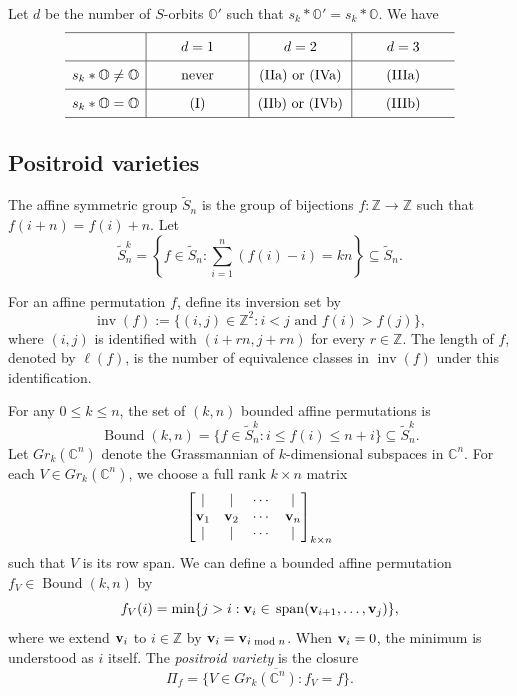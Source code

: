 \documentclass[12pt,reqno]{amsart}
\numberwithin{equation}{section}
\theoremstyle{definition}
\begin{document}
Let $d$ be the number of $S$-orbits $\mathbb{O}'$ such that $s_k*\mathbb{O}'=s_k*\mathbb{O}$.
We have 
$$\begin{array}{c|c|c|c}\hline
\vphantom{\dfrac12}
& \qquad d=1\qquad &\qquad d=2 \qquad
& \qquad d=3\qquad \\\hline
\vphantom{\dfrac12}
s_k*\mathbb{O}\neq \mathbb{O}
& \text{\rm never} & \rm (IIa) \text{ or } (IVa) & \rm (IIIa)\\\hline
\vphantom{\dfrac12}
s_k*\mathbb{O}= \mathbb{O} & \rm (I) & \rm (IIb) \text{ or } (IVb) & \rm (IIIb)\\\hline
\end{array}$$


\subsection{Positroid varieties}
The affine symmetric group $\widetilde{S}_n$ is the group of bijections $f:\mathbb{Z}\to \mathbb{Z}$ such that $f(i+n)=f(i)+n$. 
Let 
$$\widetilde{S}_{n}^{k}
=\left\{f\in \widetilde{S}_n:
\sum_{i=1}^n (f(i)-i) = kn
\right\}\subseteq \widetilde{S}_n. $$

For an affine permutation $f$, define its inversion set by
$$
\operatorname{inv}(f):=\{(i,j)\in \mathbb Z^2 : i<j \text{ and } f(i)>f(j)\},
$$
where $(i,j)$ is identified with $(i+rn,j+rn)$ for every $r\in \mathbb Z$.
The length of $f$, denoted by $\ell(f)$, is the number of equivalence classes
in $\operatorname{inv}(f)$ under this identification.

For any $0\leq k\leq n$, the set of $(k,n)$ bounded affine permutations is 
$$\operatorname{Bound}(k,n)
=\{f\in\widetilde{S}_{n}^{k}:i\leq f(i)\leq n+i\}\subseteq \widetilde{S}_n^k. 
$$
Let $Gr_k(\mathbb{C}^n)$ denote the Grassmannian of $k$-dimensional subspaces in $\mathbb{C}^n$.
For each $V\in Gr_k(\mathbb{C}^n)$, we choose a full rank $k\times n$  matrix 
$$\left[
\begin{matrix}%
\mid & \mid & \cdots & \mid\\
\vv_1 & \vv_2 & \cdots & \vv_n\\
\mid & \mid & \cdots & \mid\\
\end{matrix}\right]_{k\times n}$$
such that $V$ is its row  span. 
We can define a bounded affine permutation $f_V\in \operatorname{Bound}(k,n)$ by 
$$f_V(i)= \min\{j>i:\mathbf{v}_i\in \\
\operatorname{span}(\mathbf{v}_{i+1},\ldots,\mathbf{v}_j)\},$$
where we extend $\mathbf{v}_i$ to $i\in \mathbb{Z}$ by $\mathbf{v}_{i}=\mathbf{v}_{i\bmod n}$. 
When $\mathbf{v}_i=0$, the minimum is understood as $i$ itself. 
The \emph{positroid variety} is the closure
$$\Pi_f = \overline{\{V\in Gr_k(\mathbb{C}^n): 
f_V=f\}}.$$
\end{document}
